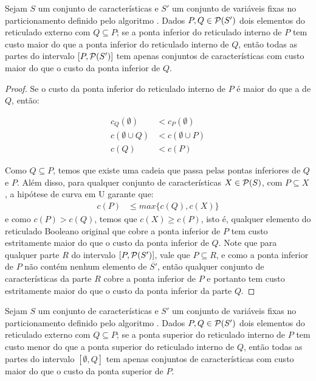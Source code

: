 \begin{mytheorem}
\label{theorem:pucs:pruning}
Sejam $S$ um conjunto de características e $S'$ um conjunto de variáveis
fixas no particionamento definido pelo algoritmo . Dados
$P, Q \in \mathcal{P} (S')$ dois elementos do reticulado externo com 
$Q \subseteq P$; se a ponta inferior do reticulado interno de $P$ tem 
custo maior do que a ponta inferior do reticulado interno de $Q$, então 
todas as partes do intervalo $[P, \mathcal{P} (S')]$ tem apenas conjuntos 
de características com custo maior do que o custo da ponta inferior de 
$Q$.
\end{mytheorem}
\begin{proof}
Se o custo da ponta inferior do reticulado interno de $P$ é maior do que
a de $Q$, então:

\begin{align*}
    c_Q (\emptyset) & < c_P (\emptyset) \\
    c (\emptyset \cup Q) & < c (\emptyset \cup P) \\
    c (Q) & < c (P) 
\end{align*}

Como $Q \subseteq P$, temos que existe uma cadeia que passa pelas pontas
inferiores de $Q$ e $P$. Além disso, para qualquer conjunto de 
características $X \in \mathcal{P} (S)$, com $P \subseteq X$, a hipótese 
de curva em U garante que:
\begin{align*}
    c (P) & \leq max \{c (Q), c (X)\}
\end{align*}
e como $c (P) > c (Q)$, temos que $c (X) \geq c (P)$, isto é, qualquer 
elemento do reticulado Booleano original que cobre a ponta inferior de 
$P$ tem custo estritamente maior do que o custo da ponta inferior de $Q$.
Note que para qualquer parte $R$ do intervalo $[P, \mathcal{P} (S')]$, 
vale que $P \subseteq R$, e como a ponta inferior de $P$ não contém 
nenhum elemento de $\overline {S'}$, então qualquer conjunto de 
características da parte $R$ cobre a ponta inferior de $P$ e portanto 
tem custo estritamente maior do que o custo da ponta inferior da parte 
$Q$.
\end{proof}

\begin{mytheorem}
\label{theorem:pucs:pruning_dual}
Sejam $S$ um conjunto de características e $S'$ um conjunto de variáveis
fixas no particionamento definido pelo algoritmo . Dados
$P, Q \in \mathcal{P} (S')$ dois elementos do reticulado externo com 
$Q \subseteq P$; se a ponta superior do reticulado interno de $P$ tem 
custo menor do que a ponta superior do reticulado interno de $Q$, então 
todas as partes do intervalo $[\emptyset, Q]$ tem apenas conjuntos 
de características com custo maior do que o custo da ponta superior de 
$P$.
\end{mytheorem}

